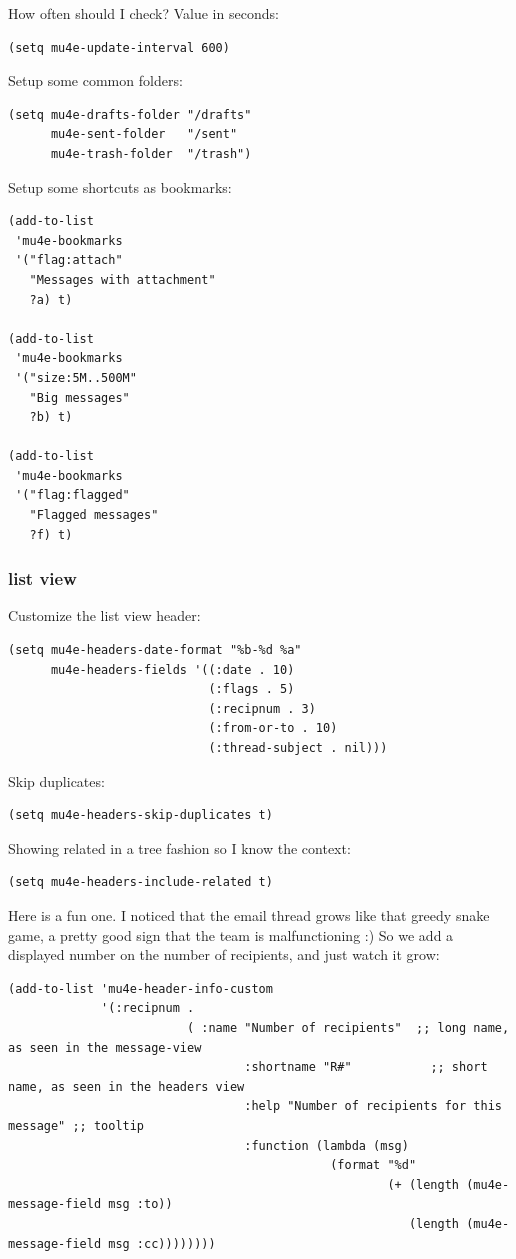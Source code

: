 \documentclass[11pt]{article}
\begin{document}
How often should I check? Value in seconds:
\begin{verbatim}
(setq mu4e-update-interval 600)
\end{verbatim}

Setup some common folders:
\begin{verbatim}
(setq mu4e-drafts-folder "/drafts"
      mu4e-sent-folder   "/sent"
      mu4e-trash-folder  "/trash")
\end{verbatim}

Setup some shortcuts as bookmarks:
\begin{verbatim}
(add-to-list
 'mu4e-bookmarks
 '("flag:attach"
   "Messages with attachment"
   ?a) t)

(add-to-list
 'mu4e-bookmarks
 '("size:5M..500M"
   "Big messages"
   ?b) t)

(add-to-list
 'mu4e-bookmarks
 '("flag:flagged"
   "Flagged messages"
   ?f) t)
\end{verbatim}

\subsubsection{list view}
\label{sec:orgce27f1a}
Customize the list view header:
\begin{verbatim}
(setq mu4e-headers-date-format "%b-%d %a"
      mu4e-headers-fields '((:date . 10)
                            (:flags . 5)
                            (:recipnum . 3)
                            (:from-or-to . 10)
                            (:thread-subject . nil)))
\end{verbatim}

Skip duplicates:

\begin{verbatim}
(setq mu4e-headers-skip-duplicates t)
\end{verbatim}

Showing related in a tree fashion so I know the context:

\begin{verbatim}
(setq mu4e-headers-include-related t)
\end{verbatim}

Here is a fun one. I noticed that the email thread grows like that greedy snake game, a pretty good sign that the team is malfunctioning :) So we add a displayed number on the number of recipients, and just watch it grow:
\begin{verbatim}
(add-to-list 'mu4e-header-info-custom
             '(:recipnum .
                         ( :name "Number of recipients"  ;; long name, as seen in the message-view
                                 :shortname "R#"           ;; short name, as seen in the headers view
                                 :help "Number of recipients for this message" ;; tooltip
                                 :function (lambda (msg)
                                             (format "%d"
                                                     (+ (length (mu4e-message-field msg :to))
                                                        (length (mu4e-message-field msg :cc))))))))

\end{verbatim}
\end{document}
